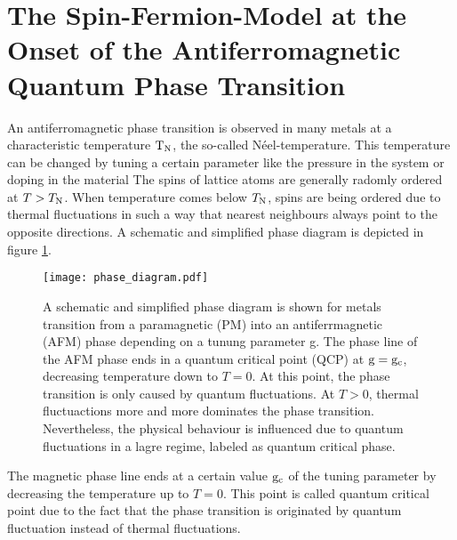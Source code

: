 \section{The Spin-Fermion-Model at the Onset of the Antiferromagnetic Quantum Phase Transition}
\label{sec:spin-fermion-model}
%
%
An antiferromagnetic phase transition is observed in many metals at a characteristic temperature $\mathrm{T}_{\mathrm{N}}$, the so-called N\'eel-temperature.
This temperature can be changed by tuning a certain parameter like the pressure in the system or doping in the material
The spins of lattice atoms are generally radomly ordered at $T > T_{\mathrm{N}}$.
When temperature comes below $T_{\mathrm{N}}$, spins are being ordered due to thermal fluctuations in such a way that nearest neighbours always point to the opposite directions.
A schematic and simplified phase diagram is depicted in figure \ref{fig:phase diagram}.
%
\begin{figure}[t]
	\centering
	\texttt{[image: phase\_diagram.pdf]}
	\caption{
A schematic and simplified phase diagram is shown for metals transition from a paramagnetic (PM) into an antiferrmagnetic (AFM) phase depending on a tunung parameter g.
The phase line of the AFM phase ends in a quantum critical point (QCP) at $\mathrm{g} = \mathrm{g}_{\mathrm{c}}$, decreasing temperature down to $T = 0$.
At this point, the phase transition is only caused by quantum fluctuations.
At $T > 0$, thermal fluctuactions more and more dominates the phase transition.
Nevertheless, the physical behaviour is influenced due to quantum fluctuations in a lagre regime, labeled as quantum critical phase.
	}
	\label{fig:phase diagram}
\end{figure}
%
The magnetic phase line ends at a certain value $\mathrm{g}_{\mathrm{c}}$ of the tuning parameter by decreasing the temperature up to $T=0$.
This point is called quantum critical point due to the fact that the phase transition is originated by quantum fluctuation instead of thermal fluctuations.

